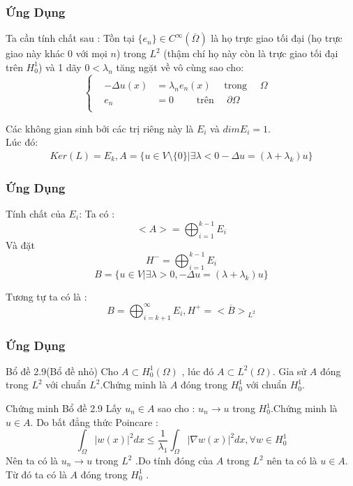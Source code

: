 \documentclass[11pt]{beamer}
\numberwithin{equation}{section}
\theoremstyle{plain}
\theoremstyle{definition}
\theoremstyle{remark}
\begin{document}
\begin{frame}
\frametitle{Ứng Dụng}
\begin{block}{Ta cần tính chất sau :}
Tồn tại $\{e_n\}\in C^{\infty}(\overline{\Omega})$ là họ trực giao tối đại (họ trực giao này khác 0 với mọi $n$) trong $L^2$ (thậm chí họ này còn là trực giao tối đại trên $H_0^1$) và 1 dãy $0<\lambda_n$ tăng ngặt về vô cùng sao cho:
\[
\begin{cases}
\begin{array}{c}
\begin{aligned}
-\Delta u(x)&=\lambda_n e_n(x)\quad \text{ trong } \quad \Omega\\
 e_n&=0\qquad \text{ trên } \quad \partial\Omega
\end{aligned}
\end{array} 
\end{cases}
\]
\end{block}
\begin{block}
\noindent Các không gian sinh bởi các trị riêng này là $E_i$ và $dim E_i=1$.\\
Lúc đó:
\begin{align*}
Ker(L)=E_k,A=\{u\in V\setminus\{0\}|\exists \lambda<0-\Delta u=(\lambda+\lambda_k) u\}
\end{align*}
\end{block}
\end{frame}

\begin{frame}
\frametitle{Ứng Dụng}
\begin{block}{Tính chất của  $E_i$:}
Ta có :$$<A>=\bigoplus_{i=1}^{k-1}E_i$$
Và đặt $$H^{-}=\bigoplus_{i=1}^{k-1}E_i$$
$$B=\{u\in V|\exists \lambda>0 ,-\Delta u=(\lambda+\lambda_k) u\}$$
\end{block}
\begin{block}{Tương tự ta có là : }
$$
B=\bigoplus_{i=k+1}^{\infty}E_i,H^{+}=\overline{<B>}_{L^2}
$$
\end{block}
\end{frame}

\begin{frame}
\frametitle{Ứng Dụng}
\begin{block}{Bổ đề 2.9(Bổ đề nhỏ)} Cho $A\subset H^1_0{(\Omega)}$ , lúc đó $A\subset L^2(\Omega)$. Gỉa sử $A$ đóng trong $L^2$ với chuẩn $L^2$.Chứng minh là $A$ đóng trong $H^1_0$ với chuẩn $H^1_0$.
\end{block}
\begin{block}{Chứng minh Bổ đề 2.9}
Lấy $u_n\in A$ sao cho : $u_n\rightarrow u$ trong $H^1_0 $.Chứng minh là $u\in A$. 
Do bất đẳng thức Poincare : $$\int_{\Omega}|w(x)|^2dx\leq \frac{1}{\lambda_1}\int_{\Omega}|\nabla w(x)|^2dx,\forall w\in H^1_0$$
Nên ta có là $u_n\rightarrow u$ trong $L^2$ .Do tính đóng của $A$ trong $L^2$ nên ta có là $u\in A$. Từ đó ta có là $A$ đóng trong $H^1_0$ .
\end{block}
\end{frame}
\end{document}
